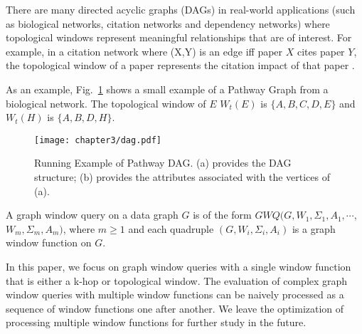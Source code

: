 There are many directed acyclic graphs (DAGs) in real-world applications (such as biological networks, citation networks and dependency networks)
where topological windows represent meaningful relationships that are of interest.
For example, in a citation network where (X,Y) is an edge  iff paper $X$ cites paper $Y$, 
the topological window of a paper represents the citation impact of that paper \cite{Ma2008Pagerank,Holsapple2003CAI,Campanario:2011ESJ}.

As an example, Fig.~\ref{fig:topological} shows a small example of a Pathway Graph from a biological network. 
The topological window of $E$ $W_t(E)$ is $\{A, B, C, D, E\}$ and $W_t(H)$ is $\{A, B, D, H\}$.


\begin{figure}[h]
\centering
 \texttt{[image: chapter3/dag.pdf]}
	\caption{Running Example of Pathway DAG. (a) provides the DAG structure; (b) provides the attributes associated with the vertices of (a).}
	\label{fig:topological}
\end{figure}

\begin{definition} 
A graph window query on a data graph $G$ is of the form
$GWQ(G, W_1, \Sigma_1, A_1,\cdots,$ \\
$W_m, \Sigma_m, A_m)$, where $m \geq 1$
and
each quadruple $(G, W_i,\Sigma_i,A_i)$ is a graph window function on $G$.
\end{definition}
In this paper, we focus on graph window queries with a single window 
function that is either a k-hop or topological window. 
The evaluation of complex graph window queries with multiple window 
functions can be naively processed as a sequence of window functions one
after another. We leave the optimization of processing multiple
window functions for further study in the future.

